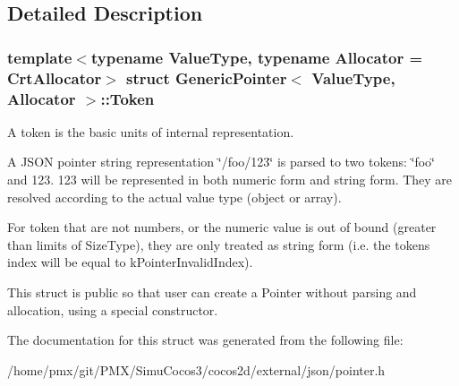 \subsection{Detailed Description}
\subsubsection*{template$<$typename Value\+Type, typename Allocator = Crt\+Allocator$>$\newline
struct Generic\+Pointer$<$ Value\+Type, Allocator $>$\+::\+Token}

A token is the basic units of internal representation. 

A J\+S\+ON pointer string representation \char`\"{}/foo/123\char`\"{} is parsed to two tokens\+: \char`\"{}foo\char`\"{} and 123. 123 will be represented in both numeric form and string form. They are resolved according to the actual value type (object or array).

For token that are not numbers, or the numeric value is out of bound (greater than limits of Size\+Type), they are only treated as string form (i.\+e. the token\textquotesingle{}s index will be equal to k\+Pointer\+Invalid\+Index).

This struct is public so that user can create a Pointer without parsing and allocation, using a special constructor. 

The documentation for this struct was generated from the following file\+:\begin{DoxyCompactItemize}
\item 
/home/pmx/git/\+P\+M\+X/\+Simu\+Cocos3/cocos2d/external/json/pointer.\+h\end{DoxyCompactItemize}
